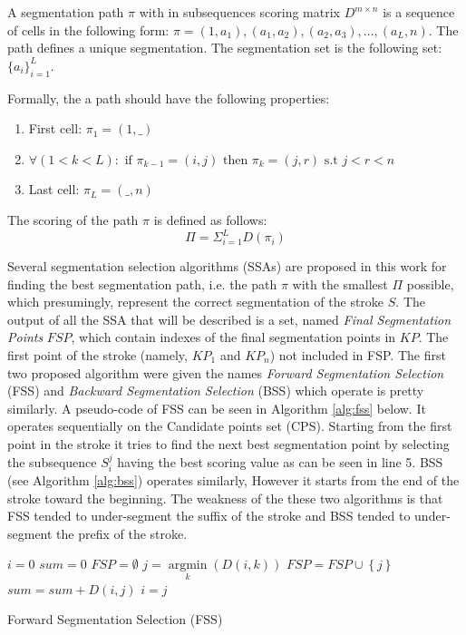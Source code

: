 \documentclass[journal,compsoc]{IEEEtran}
\begin{document}
A segmentation path $\pi$ with in subsequences scoring matrix $D^{m\times n}$ is a sequence of cells in the following form: $\pi=(1,a_{1}),(a_{1},a_{2}),(a_{2},a_{3}),...,(a_{L},n)$. The path defines a unique segmentation. The segmentation set is the following set:  $\{a_{i}\}_{i=1}^L$.

Formally, the a path should have the following properties:
\begin{enumerate}
\item First cell: $\pi_{1}=(1,\_)$
\item $ \forall (1<k<L): \mbox{ if } \pi_{k-1}=(i,j) \mbox{ then } \pi_{k}=(j,r) \mbox{ s.t } j<r<n$
\item Last cell: $\pi_{L}=(\_,n)$
\end{enumerate}
The scoring of the path $\pi$ is defined as follows:
\begin{equation}
\Pi = \Sigma_{i=1}^{L}{D(\pi_{i})}
\end{equation}

Several segmentation selection algorithms (SSAs) are proposed in this work for finding the best segmentation path, i.e. the path $\pi$ with the smallest $\Pi$ possible, which presumingly, represent the correct segmentation of the stroke $S$. The output of all the SSA that will be described is a set, named \emph{Final Segmentation Points} $FSP$, which contain indexes of the final segmentation points in $KP$. The first point of the stroke (namely, $KP_1$ and $KP_n$) not included in FSP.
The first two proposed algorithm were given the names \emph{Forward Segmentation Selection} (FSS) and \emph{Backward Segmentation Selection} (BSS) which operate is pretty similarly. A pseudo-code of FSS can be seen in Algorithm \ref{alg:fss} below. It operates sequentially on the Candidate points set (CPS). Starting from the first point in the stroke it tries to find the next best segmentation point by selecting the subsequence $S_i^j$ having the best scoring value as can be seen in line 5.  BSS (see Algorithm \ref{alg:bss}) operates similarly, However it starts from the end of the stroke toward the beginning. The weakness of the these two algorithms is that FSS tended to under-segment the suffix of the stroke and BSS tended to under-segment the prefix of the stroke.   

\begin{algorithm}
$i=0$\;
$sum=0$\;
$FSP = \emptyset $\;
{
	$j = \mathop {\arg \min }\limits_k \left( {D\left( {i,k} \right)} \right)$\;
	$FSP = FSP \cup \left\{ j \right\}$\;
	$sum = sum + D\left( {i,j} \right)$\;
	$i=j$\;
}
\caption{Forward Segmentation Selection (FSS)}
\label{alg:fss}
\end{algorithm}
\end{document}
